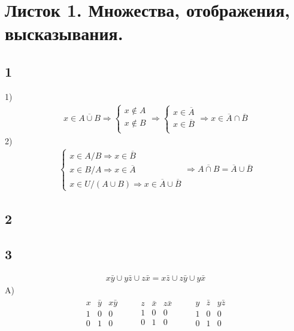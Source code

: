 \newpage	
	\section{Листок 1. Множества, отображения, высказывания.}
		\subsection{1}
		1)
		\begin{gather*}
			x \in \overline{A \cup B} 
			\Longrightarrow 
			\begin{cases}
				x \notin A \\
				x \notin B \\
			\end{cases}
			\Longrightarrow 
			\begin{cases}
				x \in \overline{A} \\
				x \in \overline{B} \\
			\end{cases}
			\Longrightarrow 
			x \in \overline{A} \cap \overline{B} 
		\end{gather*}
		2)
		\begin{gather*}
			\begin{cases}
				x \in A/B \Longrightarrow x \in \overline{B}\\
				x \in B/A \Longrightarrow x \in \overline{A}\\
				x \in U/(A \cup B) \Longrightarrow x \in \overline{A} \cup \overline{B}
			\end{cases}
			\Longrightarrow
			\overline{A \cap B} = \overline{A} \cup \overline{B}
		\end{gather*}
		
		\subsection{2}
				
		
		\subsection{3}
		\begin{gather*}
			x \bar y \cup y \bar z \cup z \bar x = x \bar z \cup z \bar y \cup y \bar x
		\end{gather*}
		A)\\
		\begin{gather*}
			\begin{matrix}
				x & \bar y & x \bar y \\
				1 & 0 & 0 \\
				0 & 1 & 0
			\end{matrix}
		\qquad
			\begin{matrix}
				z & \bar x & z \bar x \\
				1 & 0 & 0 \\
				0 & 1 & 0
			\end{matrix}
		\qquad
			\begin{matrix}
				y & \bar z & y \bar z \\
				1 & 0 & 0 \\
				0 & 1 & 0
			\end{matrix}		
		\end{gather*}				
		
